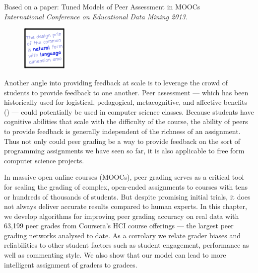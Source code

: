 
Based on a paper: Tuned Models of Peer Assessment in MOOCs \\ \emph{International Conference on Educational Data Mining 2013.}

\vspace{7mm}

\begin{figure}[h!]
\includegraphics[width=0.2\textwidth]{img/assnType_5}
\end{figure}

\vspace{7mm}

Another angle into providing feedback at scale is to leverage the crowd of students to provide feedback to one another. Peer assessment --- which has been historically used 
for logistical, pedagogical, metacognitive, and affective benefits (\cite{sadler06})
 --- 
could potentially be used in computer science classes. Because students have cognitive abilities that scale with the difficulty of the course, the ability of peers to provide feedback is generally independent of the richness of an assignment. Thus not only could peer grading be a way to provide feedback on the sort of programming assignments we have seen so far, it is also applicable to free form computer science projects.

In massive open online courses (MOOCs), peer grading serves as a critical tool for scaling the grading of complex, open-ended assignments to courses with tens or hundreds of thousands of students. But despite promising initial trials, it does not always deliver accurate results compared to human experts. In this chapter, we develop algorithms for improving peer grading accuracy on real data with 63,199 peer grades from Coursera's HCI course offerings --- the largest peer grading networks analysed to date. As a corrolary we relate grader biases and reliabilities to other student factors such as student engagement, performance as well as commenting style. We also show that our model can lead to more intelligent assignment of graders to gradees.

